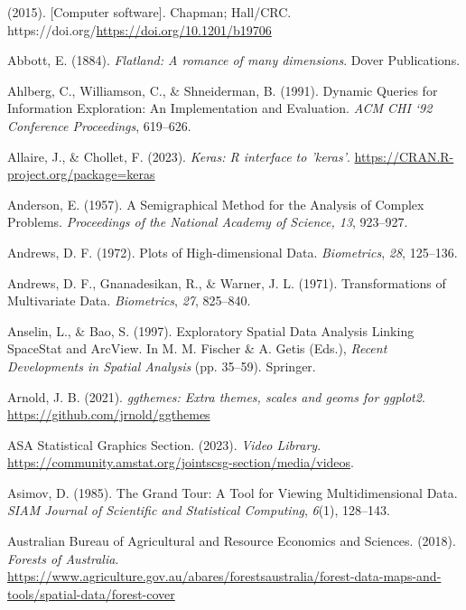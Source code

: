 \documentclass[
  letterpaper,
]{krantz}
\newlength{\cslhangindent}
\newenvironment{CSLReferences}[2] %
 {\begin{list}{}{%
  \setlength{\itemindent}{0pt}
  \setlength{\leftmargin}{0pt}
  \setlength{\parsep}{0pt}
  \ifodd #1
   \setlength{\leftmargin}{\cslhangindent}
   \setlength{\itemindent}{-1\cslhangindent}
  \fi
  \setlength{\itemsep}{#2\baselineskip}}}
 {\end{list}}
\begin{document}
\label{refs}
\begin{CSLReferences}{1}{0}
(2015). {[}Computer software{]}. Chapman; Hall/CRC.
https://doi.org/\url{https://doi.org/10.1201/b19706}

Abbott, E. (1884). \emph{Flatland: A romance of many dimensions}. Dover
Publications.

Ahlberg, C., Williamson, C., \& Shneiderman, B. (1991). Dynamic
{Q}ueries for {I}nformation {E}xploration: {A}n {I}mplementation and
{E}valuation. \emph{ACM CHI `92 Conference Proceedings}, 619--626.

Allaire, J., \& Chollet, F. (2023). \emph{Keras: {R} interface to
'keras'}. \url{https://CRAN.R-project.org/package=keras}

Anderson, E. (1957). A {S}emigraphical {M}ethod for the {A}nalysis of
{C}omplex {P}roblems. \emph{Proceedings of the National Academy of
Science, 13}, 923--927.

Andrews, D. F. (1972). {P}lots of {H}igh-dimensional {D}ata.
\emph{Biometrics}, \emph{28}, 125--136.

Andrews, D. F., Gnanadesikan, R., \& Warner, J. L. (1971).
{T}ransformations of {M}ultivariate {D}ata. \emph{Biometrics},
\emph{27}, 825--840.

Anselin, L., \& Bao, S. (1997). {E}xploratory {S}patial {D}ata
{A}nalysis {L}inking {S}pace{S}tat and {A}rc{V}iew. In M. M. Fischer \&
A. Getis (Eds.), \emph{{R}ecent {D}evelopments in {S}patial {A}nalysis}
(pp. 35--59). Springer.

Arnold, J. B. (2021). \emph{{ggthemes}: Extra themes, scales and geoms
for ggplot2}. \url{https://github.com/jrnold/ggthemes}

ASA Statistical Graphics Section. (2023). \emph{Video {L}ibrary}.
\url{https://community.amstat.org/jointscsg-section/media/videos}.

Asimov, D. (1985). {T}he {G}rand {T}our: {A} {T}ool for {V}iewing
{M}ultidimensional {D}ata. \emph{SIAM Journal of Scientific and
Statistical Computing}, \emph{6}(1), 128--143.

Australian Bureau of Agricultural and Resource Economics and Sciences.
(2018). \emph{{Forests of Australia}}.
\url{https://www.agriculture.gov.au/abares/forestsaustralia/forest-data-maps-and-tools/spatial-data/forest-cover}


\end{CSLReferences}
\end{document}
